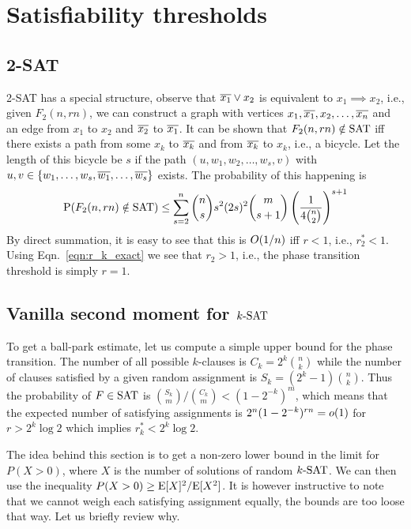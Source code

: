 \documentclass[letterpaper, 10pt, twocolumn, reqno]{amsart}
\begin{document}
\section{Satisfiability thresholds}
\label{sec:sat_thresh}


\subsection{2-SAT}
\label{ssec:2sat}
2-SAT has a special structure, observe that $\overline{x_1} \vee x_2$ is equivalent to $x_1 \implies x_2$, i.e., given $F_2(n, rn)$, we can construct a graph with
vertices $x_1, \overline{x_1}, x_2, \ldots, \overline{x_n}$ and an edge from $x_1$ to $x_2$ and $\overline{x_2}$ to $\overline{x_1}$. It can be shown that $F_2(n,rn) \notin \textrm{SAT}$ iff
there exists a path from some $x_k$ to $\overline{x_k}$ and from $\overline{x_k}$ to $x_k$, i.e., a bicycle. Let the length of this bicycle be $s$ if the path $(u, w_1, w_2
, \ldots, w_s, v)$ with $u,v \in \{w_1, \ldots, w_s,\overline{w_1}, \ldots, \overline{w_s}\}$
exists. The probability of this happening is
$$
\textrm{P}(F_2(n,rn) \notin \textrm{SAT}) \leq \sum_{s=2}^n {n \choose s} s^2 (2s)^2 {m \choose s+1} \left(\frac{1}{4 {n \choose 2}}\right)^{s+1}
$$
By direct summation, it is easy to see that this is $O(1/n)$ iff $r <1$, i.e., $r_2^* < 1$. Using Eqn.~\eqref{eqn:r_k_exact} we see that $r_2 > 1$, i.e., the phase transition threshold is simply $r = 1$.

\subsection{Vanilla second moment for $k\textrm{-SAT}$}
\label{ssec:ksat_vanilla}
To get a ball-park estimate, let us compute a simple upper bound for the phase transition. The number of all possible $k$-clauses is $C_k = 2^k {n \choose k}$ while the number of clauses satisfied by a given random assignment is $S_k = (2^k -1) {n \choose k}$. Thus the probability of $F \in \textrm{SAT}$ is ${S_k \choose m}/{C_k \choose m} < (1-2^{-k})^m$, which means that the expected number of satisfying assignments is $2^n (1-2^{-k})^{rn} = o(1)$ for $r > 2^k \log 2$ which implies $r_k^* < 2^k \log 2$.

The idea behind this section is to get a non-zero lower bound in the limit for $P(X > 0)$, where $X$ is the number of solutions of random $k\textrm{-SAT}$. We can then use the inequality $P(X>0) \geq \textrm{E}[X]^2/\textrm{E}[X^2]$. It is however instructive to note that we cannot weigh each satisfying assignment equally, the bounds are too loose that way. Let us briefly review why.
\end{document}
